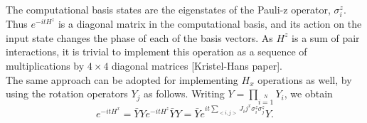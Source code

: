 \documentclass[12]{article}
\begin{document}
The computational basis states are the eigenstates of the Pauli-z operator, $\sigma_i^z$. Thus $e^{-itH^z}$ is a diagonal matrix in the computational basis, and its action on the input state changes the phase of each of the basis vectors. As $H^z$ is a sum of pair interactions, it is trivial to implement this operation as a sequence of multiplications by $4 \times 4$ diagonal matrices [Kristel-Hans paper].\\

The same approach can be adopted for implementing $H_x$ operations as well, by using the rotation operators $Y_j$ as follows. Writing $Y=\prod \limits_{i=1} \limits^{N} Y_i$, we obtain
\begin{equation}
e^{-itH^x}=\bar{Y}Y e^{-itH^z}\bar{Y}Y=\bar{Y}e^{it \sum \limits_{<i,j>} J_ij^x \sigma_i^z \sigma_j^z} Y.
\end{equation}
\end{document}
